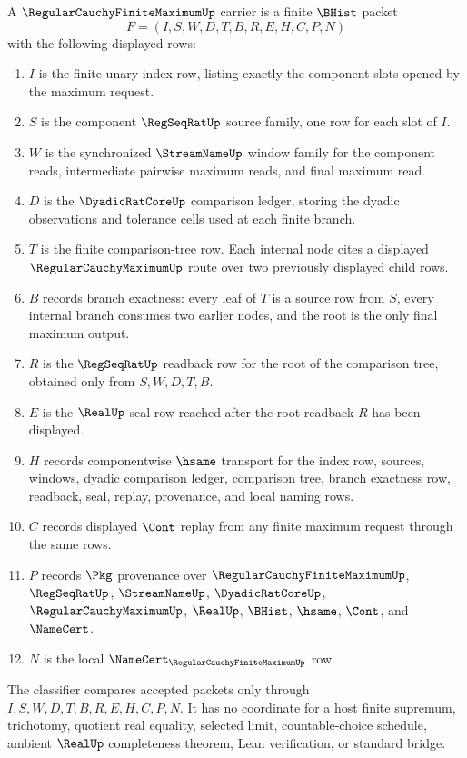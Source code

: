 \begin{definition}
\label{def:regular-cauchy-finite-maximum-carrier}
A $\RegularCauchyFiniteMaximumUp$ carrier is a finite $\BHist$ packet
$$
F=(I,S,W,D,T,B,R,E,H,C,P,N)
$$
with the following displayed rows:
\begin{enumerate}
\item $I$ is the finite unary index row, listing exactly the component slots opened by the maximum request.
\item $S$ is the component $\RegSeqRatUp$ source family, one row for each slot of $I$.
\item $W$ is the synchronized $\StreamNameUp$ window family for the component reads, intermediate pairwise maximum reads, and final maximum read.
\item $D$ is the $\DyadicRatCoreUp$ comparison ledger, storing the dyadic observations and tolerance cells used at each finite branch.
\item $T$ is the finite comparison-tree row. Each internal node cites a displayed $\RegularCauchyMaximumUp$ route over two previously displayed child rows.
\item $B$ records branch exactness: every leaf of $T$ is a source row from $S$, every internal branch consumes two earlier nodes, and the root is the only final maximum output.
\item $R$ is the $\RegSeqRatUp$ readback row for the root of the comparison tree, obtained only from $S,W,D,T,B$.
\item $E$ is the $\RealUp$ seal row reached after the root readback $R$ has been displayed.
\item $H$ records componentwise $\hsame$ transport for the index row, sources, windows, dyadic comparison ledger, comparison tree, branch exactness row, readback, seal, replay, provenance, and local naming rows.
\item $C$ records displayed $\Cont$ replay from any finite maximum request through the same rows.
\item $P$ records $\Pkg$ provenance over $\RegularCauchyFiniteMaximumUp$, $\RegSeqRatUp$, $\StreamNameUp$, $\DyadicRatCoreUp$, $\RegularCauchyMaximumUp$, $\RealUp$, $\BHist$, $\hsame$, $\Cont$, and $\NameCert$.
\item $N$ is the local $\NameCert_{\RegularCauchyFiniteMaximumUp}$ row.
\end{enumerate}
The classifier compares accepted packets only through $I,S,W,D,T,B,R,E,H,C,P,N$. It has no coordinate for a host finite supremum, trichotomy, quotient real equality, selected limit, countable-choice schedule, ambient $\RealUp$ completeness theorem, Lean verification, or standard bridge.
\end{definition}

